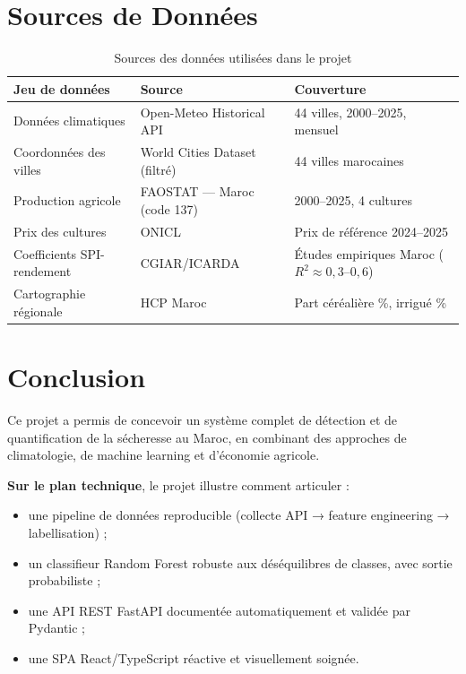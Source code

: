 \documentclass[12pt,a4paper]{report}
\begin{document}
\chapter{Sources de Données}

\begin{table}[H]
    \centering
    \begin{tabular}{p{3.5cm}p{5cm}p{5cm}}
        \toprule
        \textbf{Jeu de données} & \textbf{Source} & \textbf{Couverture} \\
        \midrule
        Données climatiques & Open-Meteo Historical API & 44 villes, 2000--2025, mensuel \\
        Coordonnées des villes & World Cities Dataset (filtré) & 44 villes marocaines \\
        Production agricole & FAOSTAT — Maroc (code 137) & 2000--2025, 4 cultures \\
        Prix des cultures & ONICL & Prix de référence 2024--2025 \\
        Coefficients SPI-rendement & CGIAR/ICARDA & Études empiriques Maroc ($R^2 \approx 0{,}3$--$0{,}6$) \\
        Cartographie régionale & HCP Maroc & Part céréalière \%, irrigué \% \\
        \bottomrule
    \end{tabular}
    \caption{Sources des données utilisées dans le projet}
\end{table}

\chapter*{Conclusion}

Ce projet a permis de concevoir un système complet de détection et de quantification de la sécheresse au Maroc, en combinant des approches de climatologie, de machine learning et d'économie agricole.

\textbf{Sur le plan technique}, le projet illustre comment articuler :
\begin{itemize}
    \item une pipeline de données reproducible (collecte API → feature engineering → labellisation) ;
    \item un classifieur Random Forest robuste aux déséquilibres de classes, avec sortie probabiliste ;
    \item une API REST FastAPI documentée automatiquement et validée par Pydantic ;
    \item une SPA React/TypeScript réactive et visuellement soignée.
\end{itemize}
\end{document}
